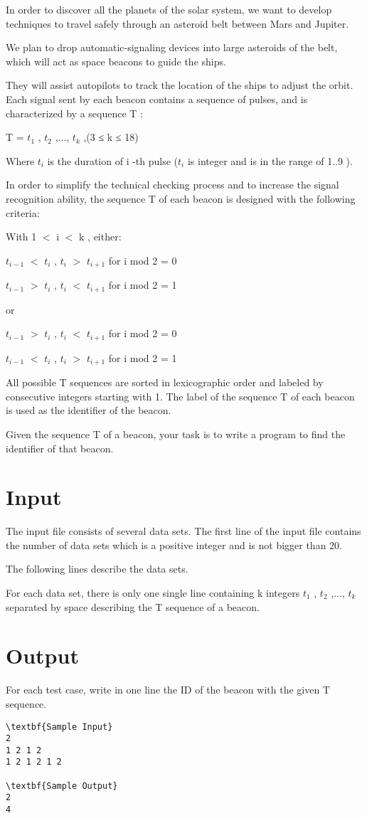 

In order to discover all the planets of the solar system, we want to develop techniques to travel safely through an asteroid belt between Mars and Jupiter.

We plan to drop automatic-signaling devices into large asteroids of the belt, which will act as space beacons to guide the ships.

They will assist autopilots to track the location of the ships to adjust the orbit. Each signal sent by each beacon contains a sequence of pulses, and is characterized by a sequence T :

T = $t_{1}$ , $t_{2}$ ,..., $t_{k}$ ,(3 ≤ k ≤ 18)

Where $t_{i}$ is the duration of i -th pulse ($t_{i}$ is integer and is in the range of 1..9 ).

In order to simplify the technical checking process and to increase the signal recognition ability, the sequence T of each beacon is designed with the following criteria:

With 1 $<$ i $<$ k , either:

$t_{i-1}$ $<$ $t_{i}$ , $t_{i}$ $>$ $t_{i+1}$ for i mod 2 = 0

$t_{i-1}$ $>$ $t_{i}$ , $t_{i}$ $<$ $t_{i+1}$ for i mod 2 = 1

or

$t_{i-1}$ $>$ $t_{i}$ , $t_{i}$ $<$ $t_{i+1}$ for i mod 2 = 0

$t_{i-1}$ $<$ $t_{i}$ , $t_{i}$ $>$ $t_{i+1}$ for i mod 2 = 1

All possible T sequences are sorted in lexicographic order and labeled by consecutive integers starting with 1. The label of the sequence T of each beacon is used as the identifier of the beacon.

Given the sequence T of a beacon, your task is to write a program to find the identifier of that beacon.

\section{Input}

The input file consists of several data sets. The first line of the input file contains the number of data sets which is a positive integer and is not bigger than 20.

The following lines describe the data sets.

For each data set, there is only one single line containing k integers $t_{1}$ , $t_{2}$ ,..., $t_{k}$ separated by space describing the T sequence of a beacon.

\section{Output}

For each test case, write in one line the ID of the beacon with the given T sequence.
\begin{verbatim}
\textbf{Sample Input}
2
1 2 1 2
1 2 1 2 1 2

\textbf{Sample Output}
2
4\end{verbatim}
